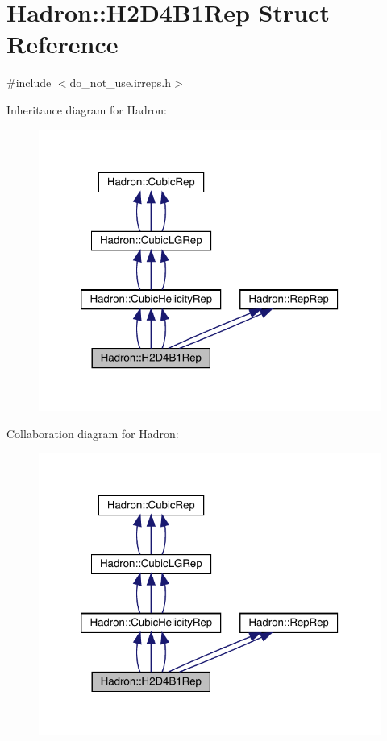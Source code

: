 \hypertarget{structHadron_1_1H2D4B1Rep}{}\section{Hadron\+:\+:H2\+D4\+B1\+Rep Struct Reference}
\label{structHadron_1_1H2D4B1Rep}


{\ttfamily \#include $<$do\+\_\+not\+\_\+use.\+irreps.\+h$>$}



Inheritance diagram for Hadron\+:
\nopagebreak
\begin{figure}[H]
\begin{center}
\leavevmode
\includegraphics[width=320pt]{de/dc1/structHadron_1_1H2D4B1Rep__inherit__graph}
\end{center}
\end{figure}


Collaboration diagram for Hadron\+:
\nopagebreak
\begin{figure}[H]
\begin{center}
\leavevmode
\includegraphics[width=320pt]{d1/d74/structHadron_1_1H2D4B1Rep__coll__graph}
\end{center}
\end{figure}
